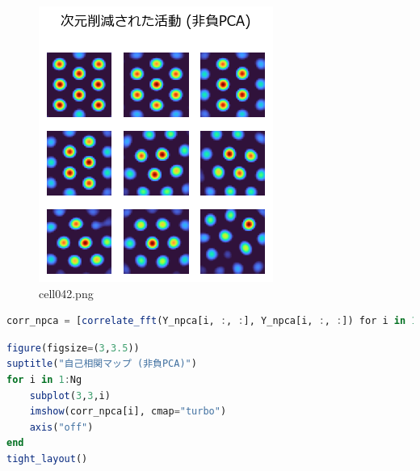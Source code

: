 \begin{figure}[ht]
	\centering
	\includegraphics[scale=0.8, max width=\linewidth]{./fig/local-learning-rule/pca-hebbian-learning/cell042.png}
	\caption{cell042.png}
	\label{cell042.png}
\end{figure}
\begin{lstlisting}[language=julia]
corr_npca = [correlate_fft(Y_npca[i, :, :], Y_npca[i, :, :]) for i in 1:Ng];
\end{lstlisting}
\begin{lstlisting}[language=julia]
figure(figsize=(3,3.5))
suptitle("自己相関マップ (非負PCA)")
for i in 1:Ng
    subplot(3,3,i)
    imshow(corr_npca[i], cmap="turbo")
    axis("off")
end
tight_layout()
\end{lstlisting}
